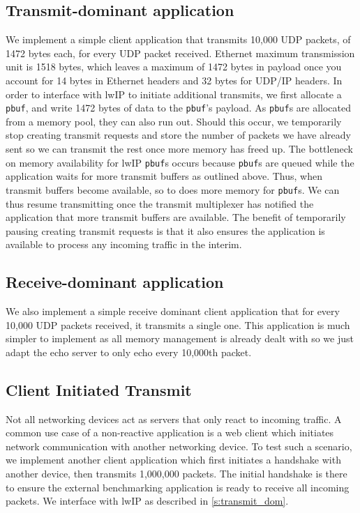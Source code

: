 \subsection{Transmit-dominant application}\label{s:transmit_dom}
We implement a simple client application that transmits 10,000 UDP packets, of 1472 bytes each, for every UDP packet received.
Ethernet maximum transmission unit is 1518 bytes, which leaves a maximum of 1472 bytes in payload once you account for 14 bytes
in Ethernet headers and 32 bytes for UDP/IP headers. 
In order to interface with lwIP to initiate additional transmits, we first allocate a \texttt{pbuf}, and write 1472 bytes of data
to the \texttt{pbuf}'s payload. As \texttt{pbuf}s are allocated from a memory pool, they can also run out. Should this occur, we temporarily
stop creating transmit requests and store the number of packets we have already sent so we can transmit the rest once more 
memory has freed up. The bottleneck on memory availability for lwIP \texttt{pbuf}s occurs because \texttt{pbuf}s are queued while the application
waits for more transmit buffers as outlined above. Thus, when transmit buffers become available, so to does more memory for
\texttt{pbuf}s. We can thus resume transmitting once the transmit multiplexer has notified the application that more
transmit buffers are available. The benefit of temporarily pausing creating transmit requests is that it also ensures the application
is available to process any incoming traffic in the interim. 

\subsection{Receive-dominant application}
We also implement a simple receive dominant client application that for every 10,000 UDP packets received, it transmits a single one.
This application is much simpler to implement as all memory management is already dealt with so we just adapt the echo server to 
only echo every 10,000th packet.

\subsection{Client Initiated Transmit}
Not all networking devices act as servers that only react to incoming traffic. A common use case of a non-reactive application is a 
web client which initiates network communication with another networking device. To test such a scenario, we implement another client
application which first initiates a handshake with another device, then transmits 1,000,000 packets. The initial handshake is there to 
ensure the external benchmarking application is ready to receive all incoming packets. We interface with lwIP as described
in \autoref{s:transmit_dom}.

